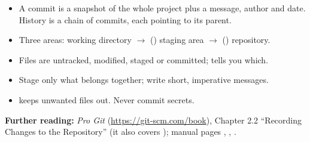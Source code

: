\begin{itemize}
  \item A commit is a snapshot of the whole project plus a message, author and date. History is a chain of commits, each pointing to its parent.
  \item Three areas: working directory $\to$ () staging area $\to$ () repository.
  \item Files are untracked, modified, staged or committed;  tells you which.
  \item Stage only what belongs together; write short, imperative messages.
  \item {} keeps unwanted files out. Never commit secrets.
\end{itemize}

\textbf{Further reading:} \emph{Pro Git} (\url{https://git-scm.com/book}), Chapter 2.2 ``Recording Changes to the Repository'' (it also covers ); manual pages , , .

\solutionspage




